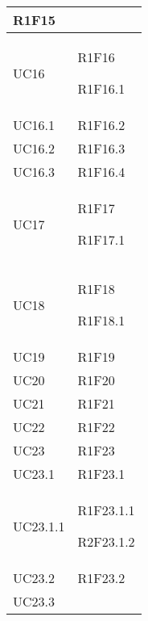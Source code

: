 \begin{center}
\begin{longtable}{|p{44mm}|p{22mm}|}
R1F15 \newline
\\
\hline
UC16 &

R1F16 \newline

R1F16.1 \newline
\\
\hline
UC16.1 &

R1F16.2 \newline
\\
\hline
UC16.2 &

R1F16.3 \newline
\\
\hline
UC16.3 &

R1F16.4 \newline
\\
\hline
UC17 &

R1F17 \newline

R1F17.1 \newline
\\
\hline
UC18 &

R1F18 \newline

R1F18.1 \newline
\\
\hline
UC19 &

R1F19 \newline
\\
\hline
UC20 &

R1F20 \newline
\\
\hline
UC21 &

R1F21 \newline
\\
\hline
UC22 &

R1F22 \newline
\\
\hline
UC23 &

R1F23 \newline
\\
\hline
UC23.1 &

R1F23.1 \newline
\\
\hline
UC23.1.1 &

R1F23.1.1 \newline

R2F23.1.2 \newline
\\
\hline
UC23.2 &

R1F23.2 \newline
\\
\hline
UC23.3 &


\end{longtable}
\end{center}
